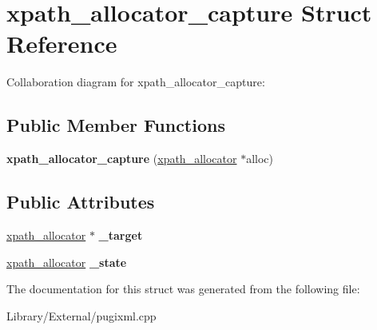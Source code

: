 \hypertarget{structxpath__allocator__capture}{}\section{xpath\+\_\+allocator\+\_\+capture Struct Reference}
\label{structxpath__allocator__capture}


Collaboration diagram for xpath\+\_\+allocator\+\_\+capture\+:
\subsection*{Public Member Functions}
\begin{DoxyCompactItemize}
\item 
\hypertarget{structxpath__allocator__capture_af6925e08c811c0cbda74d4da5b9f2eed}{}{\bfseries xpath\+\_\+allocator\+\_\+capture} (\hyperlink{classxpath__allocator}{xpath\+\_\+allocator} $\ast$alloc)\label{structxpath__allocator__capture_af6925e08c811c0cbda74d4da5b9f2eed}

\end{DoxyCompactItemize}
\subsection*{Public Attributes}
\begin{DoxyCompactItemize}
\item 
\hypertarget{structxpath__allocator__capture_a382acca931c691699ec84a03fb060cf4}{}\hyperlink{classxpath__allocator}{xpath\+\_\+allocator} $\ast$ {\bfseries \+\_\+target}\label{structxpath__allocator__capture_a382acca931c691699ec84a03fb060cf4}

\item 
\hypertarget{structxpath__allocator__capture_a275859dc99681c12b42ee4f51b713d39}{}\hyperlink{classxpath__allocator}{xpath\+\_\+allocator} {\bfseries \+\_\+state}\label{structxpath__allocator__capture_a275859dc99681c12b42ee4f51b713d39}

\end{DoxyCompactItemize}


The documentation for this struct was generated from the following file\+:\begin{DoxyCompactItemize}
\item 
Library/\+External/pugixml.\+cpp\end{DoxyCompactItemize}
